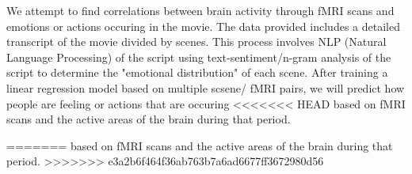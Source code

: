 \par We attempt to find correlations between brain activity through fMRI scans and emotions 
or actions occuring in the movie. The data provided includes a detailed transcript of 
the movie divided by scenes. This process involves NLP (Natural Language Processing) of 
the script using text-sentiment/n-gram analysis of the script to determine the "emotional 
distribution" of each scene. After training a linear regression model based on multiple 
scsene/ fMRI pairs, we will predict how people are feeling or actions that are occuring 
<<<<<<< HEAD
based on fMRI scans and the active areas of the brain during that period.  

=======
based on fMRI scans and the active areas of the brain during that period.   
>>>>>>> e3a2b6f464f36ab763b7a6ad6677ff3672980d56
